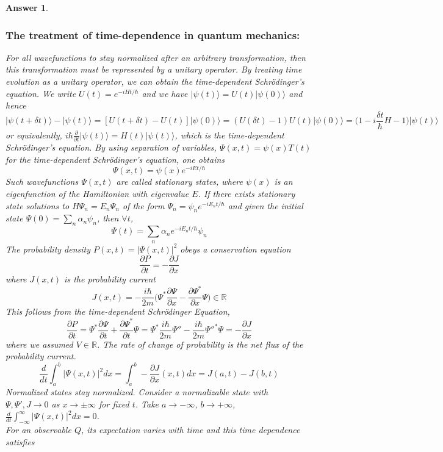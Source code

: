 \documentclass[a4paper]{article}
\newtheorem{ans}{Answer}[subsection]
\theoremstyle{new}
\begin{document}
\begin{ans}
\subsubsection*{The treatment of time-dependence in quantum mechanics:}
For all wavefunctions to stay normalized after an arbitrary transformation, then this transformation must be represented by a unitary operator. By treating time evolution as a unitary operator, we can obtain the time-dependent Schr\"{o}dinger's equation. We write $U(t)=e^{-iHt/\hbar}$ and we have $|\psi(t)\rangle=U(t)|\psi(0)\rangle$ and hence
$$|\psi(t+\delta t)\rangle-|\psi(t)\rangle=[U(t+\delta t)-U(t)]|\psi(0)\rangle=(U(\delta t)-1)U(t)|\psi(0)\rangle=\bigg(1-i\frac{\delta t}{\hbar}H-1\bigg)|\psi(t)\rangle$$
or equivalently, $i\hbar\frac{\partial}{\partial t}|\psi(t)\rangle=H(t)|\psi(t)\rangle$, which is the time-dependent Schr\"{o}dinger's equation. By using separation of variables, $\Psi(x,t)=\psi(x)T(t)$ for the time-dependent Schr\"{o}dinger's equation, one obtains 
$$\Psi(x,t)=\psi(x)e^{-iEt/\hbar}$$
Such wavefunctions $\Psi(x,t)$ are called stationary states, where $\psi(x)$ is an eigenfunction of the Hamiltonian with eigenvalue $E$. If there exists stationary state solutions to $H\Psi_n=E_n\Psi_n$ of the form $\Psi_n=\psi_ne^{-iE_nt/\hbar}$ and given the initial state $\Psi(0)=\sum_n\alpha_n\psi_n$, then $\forall t$,
$$\Psi(t)=\sum_n\alpha_ne^{-iE_nt/\hbar}\psi_n$$
The probability density $P(x,t)=|\Psi(x,t)|^2$ obeys a conservation equation
$$\frac{\partial P}{\partial t}=-\frac{\partial J}{\partial x}$$
where $J(x,t)$ is the probability current
$$J(x,t)=-\frac{i\hbar}{2m}\bigg(\Psi^*\frac{\partial\Psi}{\partial x}-\frac{\partial\Psi^*}{\partial x}\Psi\bigg)\in\mathbb{R}$$
This follows from the time-dependent Schr\"{o}dinger Equation,
$$\frac{\partial P}{\partial t}=\Psi^*\frac{\partial\Psi}{\partial t}+\frac{\partial\Psi^*}{\partial t}\Psi=\Psi^*\frac{i\hbar}{2m}\Psi''-\frac{i\hbar}{2m}\Psi''^*\Psi=-\frac{\partial J}{\partial x}$$
where we assumed $V\in\mathbb{R}$. The rate of change of probability is the net flux of the probability current.
$$\frac{d}{dt}\int_a^b|\Psi(x,t)|^2dx=\int_a^b-\frac{\partial J}{\partial x}(x,t)dx=J(a,t)-J(b,t)$$
Normalized states stay normalized. Consider a normalizable state with $\Psi,\Psi',J\rightarrow 0$ as $x\rightarrow\pm\infty$ for fixed $t$. Take $a\rightarrow-\infty$, $b\rightarrow+\infty$, $\frac{d}{dt}\int_{-\infty}^\infty|\Psi(x,t)|^2dx=0$.\\[5pt]
For an observable $Q$, its expectation varies with time and this time dependence satisfies

\end{ans}
\end{document}
